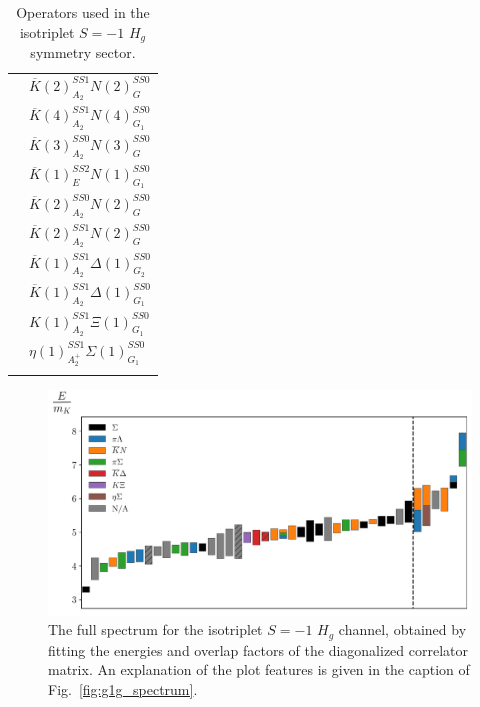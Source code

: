 \begin{longtable}{l|l}
         & $\overline K(2)_{A_2}^{SS1}N(2)_{G}^{SS0}$\\
         & $\overline K(4)_{A_2}^{SS1}N(4)_{G_1}^{SS0}$\\
         & $\overline K(3)_{A_2}^{SS0}N(3)_{G}^{SS0}$\\
         & $\overline K(1)_{E}^{SS2}N(1)_{G_1}^{SS0}$\\
         & $\overline K(2)_{A_2}^{SS0}N(2)_{G}^{SS0}$\\
         & $\overline K(2)_{A_2}^{SS1}N(2)_{G}^{SS0}$\\
         & $\overline K(1)_{A_2}^{SS1}\Delta(1)_{G_2}^{SS0}$\\
         & $\overline K(1)_{A_2}^{SS1}\Delta(1)_{G_1}^{SS0}$\\
         & $K(1)_{A_2}^{SS1}\Xi(1)_{G_1}^{SS0}$\\
         & $\eta(1)_{A_2^+}^{SS1}\Sigma(1)_{G_1}^{SS0}$\\
         \caption{Operators used in the isotriplet $S=-1$ $H_g$ symmetry sector.}\label{table:hg_ops}
\end{longtable}
\begin{figure}[H]
    \centering
    \hspace*{-0.5in}\includegraphics[width=\textwidth]{figures/sigmas/hg/staircase_mk.pdf}
    \caption{The full spectrum for the isotriplet $S=-1$ $H_g$ channel, obtained by fitting the energies and overlap factors of the diagonalized correlator matrix. An explanation of the plot features is given in the caption of Fig.~\ref{fig:g1g_spectrum}.}\label{fig:hg_spectrum}
\end{figure}

